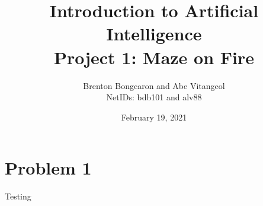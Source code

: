 \documentclass[11pt]{article}
\title{\textbf{Introduction to Artificial Intelligence\\
		\large Project 1: Maze on Fire}}
\author{Brenton Bongcaron and Abe Vitangcol\\NetIDs: bdb101 and alv88}
\date{February 19, 2021}
\begin{document}
	
	
	
	\maketitle
	\pagebreak

\section{Problem 1}
Testing
\end{document}
